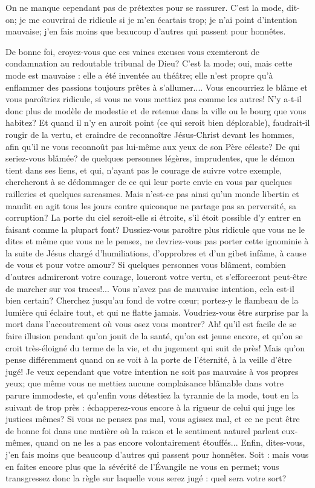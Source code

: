\documentclass[instructions.tex]{subfiles}
\begin{document}
\tertio On ne manque cependant pas de prétextes pour se rassurer. C'est la mode, dit-on; je me couvrirai de ridicule si je m'en écartais trop; je n'ai point d'intention mauvaise; j'en fais moins que beaucoup d'autres qui passent pour honnêtes.
 
De bonne foi, croyez-vous que ces vaines excuses vous exemteront de condamnation au redoutable tribunal de Dieu? C'est la mode; oui, mais cette mode est mauvaise : elle a été inventée au théâtre; elle n'est propre qu'à enflammer des passions toujours prêtes à s'allumer.... Vous encourriez le blâme et vous paroîtriez ridicule, si vous ne vous mettiez pas comme les autres! N'y a-t-il donc plus de modèle de modestie et de retenue dans la ville ou le bourg que vous habitez? Et quand il n'y en auroit point (ce qui seroit bien déplorable), faudrait-il rougir de la vertu, et craindre de reconnoître Jésus-Christ devant les hommes, afin qu'il ne vous reconnoût pas lui-même aux yeux de son Père céleste? De qui seriez-vous blâmée? de quelques personnes légères, imprudentes, que le démon tient dans ses liens, et qui, n'ayant pas le courage de suivre votre exemple, chercheront à se dédommager de ce qui leur porte envie en vous par quelques railleries et quelques sarcasmes. Mais n'est-ce pas ainsi qu'un monde libertin et maudit en agit tous les jours contre quiconque ne partage pas sa perversité, sa corruption? La porte du ciel seroit-elle si étroite, s'il étoit possible d'y entrer en faisant comme la plupart font? Dussiez-vous paroître plus ridicule que vous ne le dites et même que vous ne le pensez, ne devriez-vous pas porter cette ignominie à la suite de Jésus chargé d'humiliations, d'opprobres et d'un gibet infâme, à cause de vous et pour votre amour? Si quelques personnes vous blâment, combien d'autres admireront votre courage, loueront votre vertu, et s'efforceront peut-être de marcher sur vos traces!... Vous n'avez pas de mauvaise intention, cela est-il bien certain? Cherchez jusqu'au fond de votre cœur; portez-y le flambeau de la lumière qui éclaire tout, et qui ne flatte jamais. Voudriez-vous être surprise par la mort dans l'accoutrement où vous osez vous montrer? Ah! qu'il est facile de se faire illusion pendant qu'on jouit de la santé, qu'on est jeune encore, et qu'on se croit très-éloigné du terme de la vie, et du jugement qui suit de près! Mais qu'on pense différemment quand on se voit à la porte de l'éternité, à la veille d'être jugé! Je veux cependant que votre intention ne soit pas mauvaise à vos propres yeux; que même vous ne mettiez aucune complaisance blâmable dans votre parure immodeste, et qu'enfin vous détestiez la tyrannie de la mode, tout en la suivant de trop près : échapperez-vous encore à la rigueur de celui qui juge les justices mêmes? Si vous ne pensez pas mal, vous agissez mal, et ce ne peut être de bonne foi dans une matière où la raison et le sentiment naturel parlent eux-mêmes, quand on ne les a pas encore volontairement étouffés... Enfin, dites-vous, j'en fais moins que beaucoup d'autres qui passent pour honnêtes. Soit : mais vous en faites encore plus que la sévérité de l'Évangile ne vous en permet; vous transgressez donc la règle sur laquelle vous serez jugé : quel sera votre sort?
 
\end{document}
